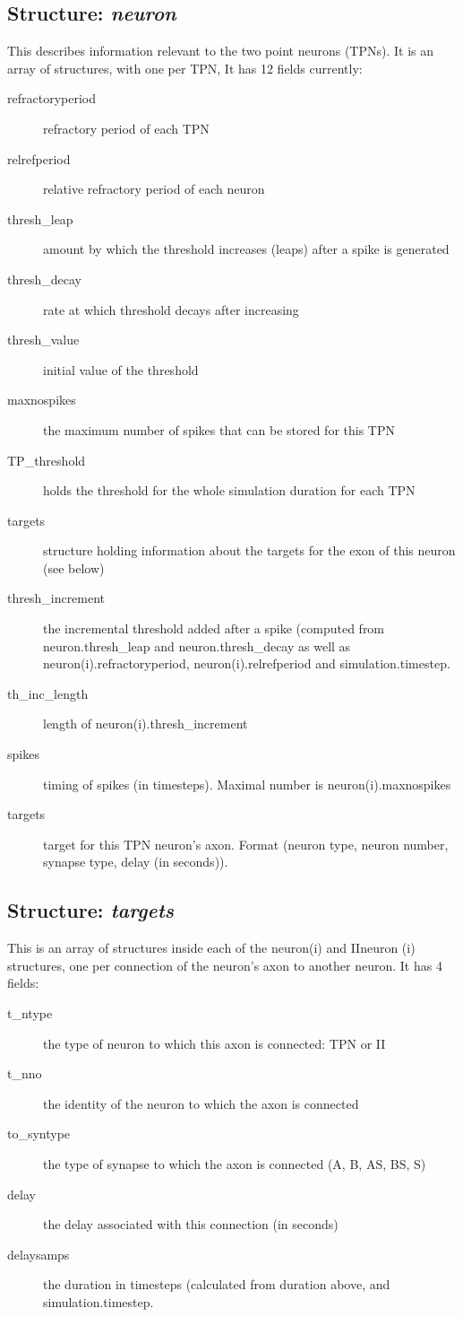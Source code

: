 \documentclass[11pt, oneside]{article}   	%
\begin{document}
\subsection{Structure: {\it neuron}}
This describes information relevant to the two point neurons (TPNs).  It is an array of structures, with one per TPN, It has 12 fields currently:
\begin{description}
\item[refractoryperiod ] refractory period of each TPN
\item[relrefperiod] relative refractory period of each neuron
\item[thresh\_leap] amount by which the threshold increases (leaps) after a spike is generated
\item[thresh\_decay] rate at which threshold decays after increasing
\item[thresh\_value] initial value of the threshold
\item[maxnospikes] the maximum number of spikes that can be stored for this TPN
\item[TP\_threshold] holds the threshold for the whole simulation duration for each TPN
\item[targets] structure holding information about the targets for the exon of this neuron (see below)
\item[thresh\_increment] the incremental threshold added after a spike (computed from neuron.thresh\_leap and neuron.thresh\_decay as well as neuron(i).refractoryperiod, neuron(i).relrefperiod and simulation.timestep.
\item[th\_inc\_length] length of neuron(i).thresh\_increment
\item[spikes] timing of spikes (in timesteps). Maximal number is neuron(i).maxnospikes
\item[targets]  target for this TPN neuron's axon. Format (neuron type, neuron number, synapse type, delay (in seconds)).
\end{description}

\subsection{Structure: {\it targets}}
This is an array of structures  inside each of the neuron(i) and IIneuron (i) structures, one per connection of the neuron's axon to another neuron. It has 4 fields:
\begin{description}
\item[t\_ntype] the type of neuron to which this axon is connected: TPN or II
\item[t\_nno] the identity of the neuron to which the axon is connected
\item[to\_syntype] the type of synapse to which the axon is connected (A, B, AS, BS, S)
\item[delay] the delay associated with this connection (in seconds)
\item[delaysamps] the duration in timesteps (calculated from duration above, and simulation.timestep.
\end{description}
\end{document}
